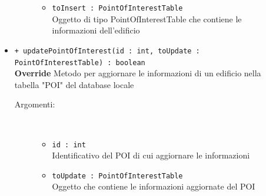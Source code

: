 \documentclass[../DefinizioneDiProdotto.tex]{subfiles}
\begin{document}
\begin{description}
\begin{itemize}
\begin{description}
\begin{itemize}
				\item \texttt{toInsert : PointOfInterestTable}\\
				Oggetto di tipo PointOfInterestTable che contiene le informazioni dell'edificio\end{itemize}
		\end{description}
		\item \texttt{+ updatePointOfInterest(id : int, toUpdate : PointOfInterestTable) : boolean}\\
		\textbf{Override} Metodo per aggiornare le informazioni di un edificio nella tabella "POI" del database locale
		\begin{description}
			\item[Argomenti:] \
			\begin{itemize}
				\item \texttt{id : int}\\
				Identificativo del POI di cui aggiornare le informazioni\item \texttt{toUpdate : PointOfInterestTable}\\
				Oggetto che contiene le informazioni aggiornate del POI\end{itemize}
		\end{description}
	\end{itemize}
\end{description}
\end{document}
